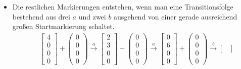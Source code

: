 \documentclass[a4paper]{scrartcl}
\begin{document}
\begin{enumerate}
\begin{itemize}
            \item
                Die restlichen Markierungen entstehen, wenn man eine
                Transitionsfolge bestehend aus drei $a$ und zwei $b$ ausgehend
                von einer gerade ausreichend großen Startmarkierung schaltet.
                \begin{equation}
                    \begin{split}
                        &
                        \begin{bmatrix}
                            4 \\ 0 \\ 0 \\ 0
                        \end{bmatrix}
                        +
                        \begin{pmatrix}
                            0 \\ 0 \\ 0 \\ 0
                        \end{pmatrix}
                        \stackrel{a}{\to}
                        \begin{bmatrix}
                            2 \\ 3 \\ 0 \\ 0
                        \end{bmatrix}
                        +
                        \begin{pmatrix}
                            0 \\ 0 \\ 0 \\ 0
                        \end{pmatrix}
                        \stackrel{a}{\to}
                        \begin{bmatrix}
                            0 \\ 6 \\ 0 \\ 0
                        \end{bmatrix}
                        +
                        \begin{pmatrix}
                            0 \\ 0 \\ 0 \\ 0
                        \end{pmatrix}
                        \stackrel{b}{\to}
                        \begin{bmatrix}

\end{bmatrix}
\end{split}
\end{equation}
\end{itemize}
\end{enumerate}
\end{document}
